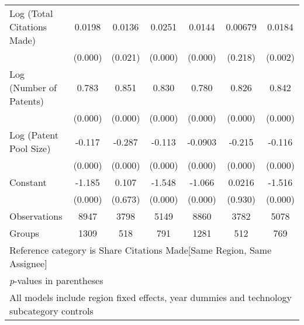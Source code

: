\begin{table}[htbp]
\begin{adjustbox}{angle=90}
\begin{tabular}{l*{6}{c}}
Log (Total Citations Made)&   0.0198&   0.0136&   0.0251&   0.0144&  0.00679&   0.0184\\
                &  (0.000)&  (0.021)&  (0.000)&  (0.000)&  (0.218)&  (0.002)\\
Log (Number of Patents)&    0.783&    0.851&    0.830&    0.780&    0.826&    0.842\\
                &  (0.000)&  (0.000)&  (0.000)&  (0.000)&  (0.000)&  (0.000)\\
Log (Patent Pool Size)&   -0.117&   -0.287&   -0.113&  -0.0903&   -0.215&   -0.116\\
                &  (0.000)&  (0.000)&  (0.000)&  (0.000)&  (0.000)&  (0.000)\\
Constant        &   -1.185&    0.107&   -1.548&   -1.066&   0.0216&   -1.516\\
                &  (0.000)&  (0.673)&  (0.000)&  (0.000)&  (0.930)&  (0.000)\\
\hline
Observations    &     8947&     3798&     5149&     8860&     3782&     5078\\
Groups          &     1309&      518&      791&     1281&      512&      769\\
\hline\hline
\multicolumn{7}{l}{\footnotesize Reference category is Share Citations Made[Same Region, Same Assignee]}\\
\multicolumn{7}{l}{\footnotesize \textit{p}-values in parentheses}\\
\multicolumn{7}{l}{\footnotesize All models include region fixed effects, year dummies and technology subcategory controls}\\
\end{tabular}
\end{adjustbox}
\end{table}
